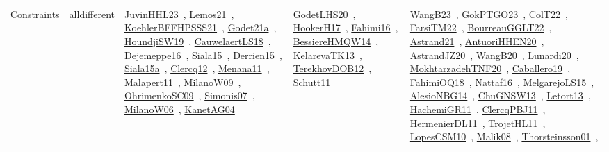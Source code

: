{\begin{longtable}{lp{3cm}>{\raggedright\arraybackslash}p{6cm}>{\raggedright\arraybackslash}p{6cm}>{\raggedright\arraybackslash}p{8cm}}
Constraints & alldifferent & \href{../works/JuvinHHL23.pdf}{JuvinHHL23}~\cite{JuvinHHL23}, \href{../works/Lemos21.pdf}{Lemos21}~\cite{Lemos21}, \href{../works/KoehlerBFFHPSSS21.pdf}{KoehlerBFFHPSSS21}~\cite{KoehlerBFFHPSSS21}, \href{../works/Godet21a.pdf}{Godet21a}~\cite{Godet21a}, \href{../works/HoundjiSW19.pdf}{HoundjiSW19}~\cite{HoundjiSW19}, \href{../works/CauwelaertLS18.pdf}{CauwelaertLS18}~\cite{CauwelaertLS18}, \href{../works/Dejemeppe16.pdf}{Dejemeppe16}~\cite{Dejemeppe16}, \href{../works/Siala15.pdf}{Siala15}~\cite{Siala15}, \href{../works/Derrien15.pdf}{Derrien15}~\cite{Derrien15}, \href{../works/Siala15a.pdf}{Siala15a}~\cite{Siala15a}, \href{../works/Clercq12.pdf}{Clercq12}~\cite{Clercq12}, \href{../works/Menana11.pdf}{Menana11}~\cite{Menana11}, \href{../works/Malapert11.pdf}{Malapert11}~\cite{Malapert11}, \href{../works/MilanoW09.pdf}{MilanoW09}~\cite{MilanoW09}, \href{../works/OhrimenkoSC09.pdf}{OhrimenkoSC09}~\cite{OhrimenkoSC09}, \href{../works/Simonis07.pdf}{Simonis07}~\cite{Simonis07}, \href{../works/MilanoW06.pdf}{MilanoW06}~\cite{MilanoW06}, \href{../works/KanetAG04.pdf}{KanetAG04}~\cite{KanetAG04} & \href{../works/GodetLHS20.pdf}{GodetLHS20}~\cite{GodetLHS20}, \href{../works/HookerH17.pdf}{HookerH17}~\cite{HookerH17}, \href{../works/Fahimi16.pdf}{Fahimi16}~\cite{Fahimi16}, \href{../works/BessiereHMQW14.pdf}{BessiereHMQW14}~\cite{BessiereHMQW14}, \href{../works/KelarevaTK13.pdf}{KelarevaTK13}~\cite{KelarevaTK13}, \href{../works/TerekhovDOB12.pdf}{TerekhovDOB12}~\cite{TerekhovDOB12}, \href{../works/Schutt11.pdf}{Schutt11}~\cite{Schutt11} & \href{../works/WangB23.pdf}{WangB23}~\cite{WangB23}, \href{../works/GokPTGO23.pdf}{GokPTGO23}~\cite{GokPTGO23}, \href{../works/ColT22.pdf}{ColT22}~\cite{ColT22}, \href{../works/FarsiTM22.pdf}{FarsiTM22}~\cite{FarsiTM22}, \href{../works/BourreauGGLT22.pdf}{BourreauGGLT22}~\cite{BourreauGGLT22}, \href{../works/Astrand21.pdf}{Astrand21}~\cite{Astrand21}, \href{../works/AntuoriHHEN20.pdf}{AntuoriHHEN20}~\cite{AntuoriHHEN20}, \href{../works/AstrandJZ20.pdf}{AstrandJZ20}~\cite{AstrandJZ20}, \href{../works/WangB20.pdf}{WangB20}~\cite{WangB20}, \href{../works/Lunardi20.pdf}{Lunardi20}~\cite{Lunardi20}, \href{../works/MokhtarzadehTNF20.pdf}{MokhtarzadehTNF20}~\cite{MokhtarzadehTNF20}, \href{../works/Caballero19.pdf}{Caballero19}~\cite{Caballero19}, \href{../works/FahimiOQ18.pdf}{FahimiOQ18}~\cite{FahimiOQ18}, \href{../works/Nattaf16.pdf}{Nattaf16}~\cite{Nattaf16}, \href{../works/MelgarejoLS15.pdf}{MelgarejoLS15}~\cite{MelgarejoLS15}, \href{../works/AlesioNBG14.pdf}{AlesioNBG14}~\cite{AlesioNBG14}, \href{../works/ChuGNSW13.pdf}{ChuGNSW13}~\cite{ChuGNSW13}, \href{../works/Letort13.pdf}{Letort13}~\cite{Letort13}, \href{../works/HachemiGR11.pdf}{HachemiGR11}~\cite{HachemiGR11}, \href{../works/ClercqPBJ11.pdf}{ClercqPBJ11}~\cite{ClercqPBJ11}, \href{../works/HermenierDL11.pdf}{HermenierDL11}~\cite{HermenierDL11}, \href{../works/TrojetHL11.pdf}{TrojetHL11}~\cite{TrojetHL11}, \href{../works/LopesCSM10.pdf}{LopesCSM10}~\cite{LopesCSM10}, \href{../works/Malik08.pdf}{Malik08}~\cite{Malik08}, \href{../works/Thorsteinsson01.pdf}{Thorsteinsson01}~\cite{Thorsteinsson01}, 
\end{longtable}}
